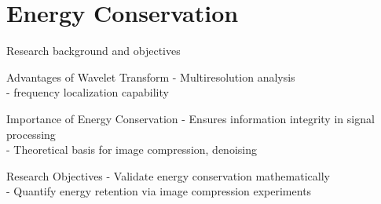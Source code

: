 \documentclass{beamer}
\begin{document}
\section{Energy Conservation}

\begin{frame}{Research background and objectives}
    \begin{block}{Advantages of Wavelet Transform}
        - Multiresolution analysis \\
        - frequency localization capability
    \end{block}

    \begin{block}{Importance of Energy Conservation}
        - Ensures information integrity in signal processing  \\
        - Theoretical basis for image compression, denoising
    \end{block}

    \begin{block}{Research Objectives}
        - Validate energy conservation mathematically  \\
        - Quantify energy retention via image compression experiments
    \end{block}
\end{frame}

\end{document}
